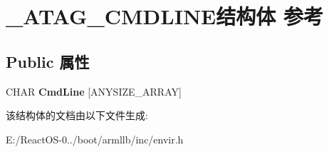 \hypertarget{struct___a_t_a_g___c_m_d_l_i_n_e}{}\section{\+\_\+\+A\+T\+A\+G\+\_\+\+C\+M\+D\+L\+I\+N\+E结构体 参考}
\label{struct___a_t_a_g___c_m_d_l_i_n_e}
\subsection*{Public 属性}
\begin{DoxyCompactItemize}
\item 
\mbox{\label{struct___a_t_a_g___c_m_d_l_i_n_e_acb39245c2e9c6249307ff5ce7640bc9b}} 
C\+H\+AR {\bfseries Cmd\+Line} \mbox{[}A\+N\+Y\+S\+I\+Z\+E\+\_\+\+A\+R\+R\+AY\mbox{]}
\end{DoxyCompactItemize}


该结构体的文档由以下文件生成\+:\begin{DoxyCompactItemize}
\item 
E\+:/\+React\+O\+S-\/0../boot/armllb/inc/envir.\+h\end{DoxyCompactItemize}
